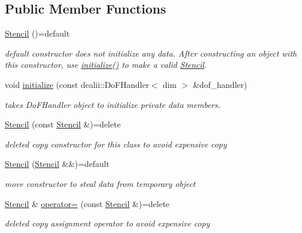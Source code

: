 \subsection*{Public Member Functions}
\begin{DoxyCompactItemize}
\item 
\hyperlink{classweno_1_1_stencil_af48d0944ac3bb69eb6dfbcd5a0c98b5c}{Stencil} ()=default
\begin{DoxyCompactList}\small\item\em default constructor does not initialize any data. After constructing an object with this constructor, use \hyperlink{classweno_1_1_stencil_a765c64da48da663c23b80f397386f9f9}{initialize()} to make a valid \hyperlink{classweno_1_1_stencil}{Stencil}. \end{DoxyCompactList}\item 
void \hyperlink{classweno_1_1_stencil_a765c64da48da663c23b80f397386f9f9}{initialize} (const dealii\+::\+Do\+F\+Handler$<$ dim $>$ \&dof\+\_\+handler)
\begin{DoxyCompactList}\small\item\em takes Do\+F\+Handler object to initialize private data members. \end{DoxyCompactList}\item 
\hyperlink{classweno_1_1_stencil_abcc20e0ca13837c075f9cf6f946123ad}{Stencil} (const \hyperlink{classweno_1_1_stencil}{Stencil} \&)=delete
\begin{DoxyCompactList}\small\item\em deleted copy constructor for this class to avoid expensive copy \end{DoxyCompactList}\item 
\hyperlink{classweno_1_1_stencil_a2f0e7f4ddbe54f7d49a562a46a4ac2fd}{Stencil} (\hyperlink{classweno_1_1_stencil}{Stencil} \&\&)=default
\begin{DoxyCompactList}\small\item\em move constructor to steal data from temporary object \end{DoxyCompactList}\item 
\hyperlink{classweno_1_1_stencil}{Stencil} \& \hyperlink{classweno_1_1_stencil_a40e7f2c183bcf383e6075c7111e55ef2}{operator=} (const \hyperlink{classweno_1_1_stencil}{Stencil} \&)=delete
\begin{DoxyCompactList}\small\item\em deleted copy assignment operator to avoid expensive copy \end{DoxyCompactList}\item 

\end{DoxyCompactItemize}
